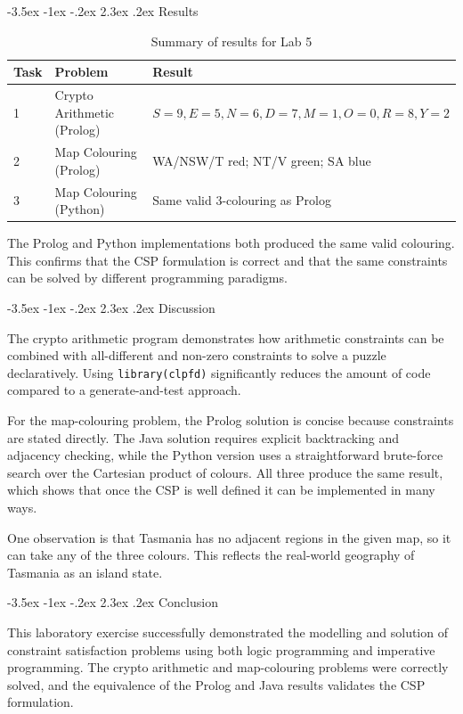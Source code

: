 \documentclass[12pt,a4paper]{article}
\makeatletter
\renewcommand{\section}{\@startsection{section}{1}{\z@}%
  {-3.5ex \@plus -1ex \@minus -.2ex}%
  {2.3ex \@plus.2ex}%
  {\normalfont\Large\bfseries}}
\makeatother
\begin{document}
\section{Results}

\begin{table}[H]
\centering
\caption{Summary of results for Lab 5}
\begin{tabular}{lll}
\toprule
\textbf{Task} & \textbf{Problem} & \textbf{Result} \\
\midrule
1 & Crypto Arithmetic (Prolog) & $S=9,E=5,N=6,D=7,M=1,O=0,R=8,Y=2$ \\
2 & Map Colouring (Prolog) & WA/NSW/T red; NT/V green; SA blue \\
3 & Map Colouring (Python) & Same valid 3-colouring as Prolog \\
\bottomrule
\end{tabular}
\end{table}

The Prolog and Python implementations both produced the same valid colouring. This confirms that the CSP formulation is correct and that the same constraints can be solved by different programming paradigms.

\section{Discussion}

The crypto arithmetic program demonstrates how arithmetic constraints can be combined with all-different and non-zero constraints to solve a puzzle declaratively.  Using \texttt{library(clpfd)} significantly reduces the amount of code compared to a generate-and-test approach.

For the map-colouring problem, the Prolog solution is concise because constraints are stated directly.  The Java solution requires explicit backtracking and adjacency checking, while the Python version uses a straightforward brute-force search over the Cartesian product of colours.  All three produce the same result, which shows that once the CSP is well defined it can be implemented in many ways.

One observation is that Tasmania has no adjacent regions in the given map, so it can take any of the three colours.  This reflects the real-world geography of Tasmania as an island state.

\section{Conclusion}

This laboratory exercise successfully demonstrated the modelling and solution of constraint satisfaction problems using both logic programming and imperative programming.  The crypto arithmetic and map-colouring problems were correctly solved, and the equivalence of the Prolog and Java results validates the CSP formulation.
\end{document}
